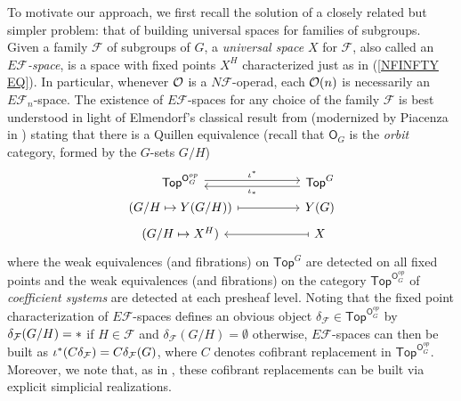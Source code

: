 \documentclass[a4paper,10pt]{article}%
\begin{document}
To motivate our approach, we first recall the solution of a closely related but simpler problem: that of building universal spaces for families of subgroups. 
Given a family $\mathcal{F}$ of subgroups of $G$, 
a \textit{universal space} $X$ for $\mathcal{F}$, 
also called an \textit{$E \mathcal{F}$-space},
is a space with fixed points $X^H$ characterized  just as in (\ref{NFINFTY EQ}).
In particular, whenever $\mathcal{O}$ is a $N \mathcal{F}$-operad, 
each $\mathcal{O}(n)$ is necessarily an $E \mathcal{F}_n$-space.
The existence of $E \mathcal{F}$-spaces for any
choice of the family $\mathcal{F}$ is 
best understood in light of Elmendorf's classical result from \cite{Elm83}
(modernized by Piacenza in \cite{Pia91})
stating that there is a Quillen equivalence
(recall that $\mathsf{O}_G$ is the \textit{orbit} category, formed by the $G$-sets $G/H$)
\begin{equation}\label{COFADJINT EQ}
\begin{tikzcd}[column sep =5em,row sep=0.3em]
	\mathsf{Top}^{\mathsf{O}_G^{op}}
	\ar[shift left=1]{r}{\iota^{\**}} 
&
	\mathsf{Top}^G
	\ar[shift left=1]{l}{\iota_{\**}}
\\
	\left(G/H \mapsto Y(G/H)\right)  \ar[mapsto]{r}&
	Y(G)
\\
	(G/H \mapsto X^H) &
	X \ar[mapsto]{l}
\end{tikzcd}
\end{equation}
where the weak equivalences (and fibrations)
on $\mathsf{Top}^G$ are detected on all fixed points and
the weak equivalences (and fibrations)
on the category $\mathsf{Top}^{\mathsf{O}_G^{op}}$ of 
\textit{coefficient systems}
are detected at each presheaf level.
Noting that the fixed point characterization of $E \mathcal{F}$-spaces defines an obvious object 
$\delta_{\mathcal{F}} \in \mathsf{Top}^{\mathsf{O}_G^{op}}$ by 
$\delta_{\mathcal{F}}(G/H)=\**$ if $H \in \mathcal{F}$ and
$\delta_{\mathcal{F}}(G/H)=\emptyset$ otherwise, 
$E \mathcal{F}$-spaces can then be built as
$\iota^{\**}(C \delta_{\mathcal{F}}) = 
C \delta_{\mathcal{F}}(G)$, where $C$ denotes cofibrant replacement in $\mathsf{Top}^{\mathsf{O}_G^{op}}$.
Moreover, we note that, as in \cite{Elm83}, these cofibrant replacements can be built via explicit simplicial realizations.
\end{document}
